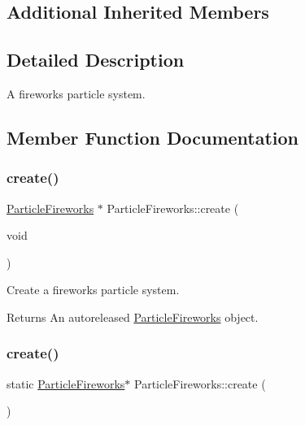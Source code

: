 \subsection*{Additional Inherited Members}


\subsection{Detailed Description}
A fireworks particle system. 

\subsection{Member Function Documentation}
\mbox{\label{classParticleFireworks_acc1b7500058526cbadec4baf3fb5d2ef}} 
\subsubsection{\texorpdfstring{create()}{create()}\hspace{0.1cm}{\footnotesize\ttfamily [1/2]}}
{\footnotesize\ttfamily \hyperlink{classParticleFireworks}{Particle\+Fireworks} $\ast$ Particle\+Fireworks\+::create (\begin{DoxyParamCaption}\item[{void}]{ }\end{DoxyParamCaption})\hspace{0.3cm}{\ttfamily [static]}}

Create a fireworks particle system.

\begin{DoxyReturn}{Returns}
An autoreleased \hyperlink{classParticleFireworks}{Particle\+Fireworks} object. 
\end{DoxyReturn}
\mbox{\label{classParticleFireworks_a5df044193657794b3eadbc6e136fb1dd}} 
\subsubsection{\texorpdfstring{create()}{create()}\hspace{0.1cm}{\footnotesize\ttfamily [2/2]}}
{\footnotesize\ttfamily static \hyperlink{classParticleFireworks}{Particle\+Fireworks}$\ast$ Particle\+Fireworks\+::create (\begin{DoxyParamCaption}{ }\end{DoxyParamCaption})\hspace{0.3cm}{\ttfamily [static]}}

